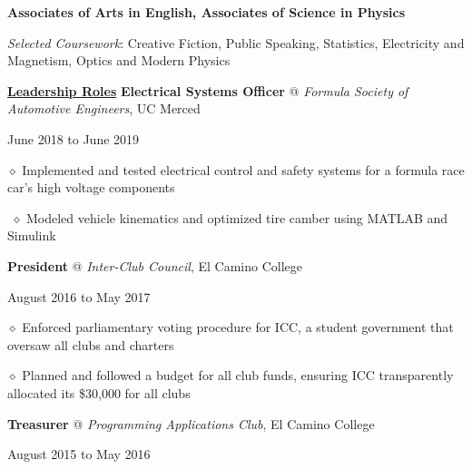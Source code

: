 \documentclass [11pt]{article}
\begin{document}
\begin{flushleft}
\textbf{Associates of Arts in English, Associates of Science in Physics}

\raggedright
\emph{Selected Coursework}: Creative Fiction, Public Speaking, Statistics, Electricity and Magnetism, Optics and Modern Physics
\normalsize

\linebreak
\raggedright

\vspace{7}
\underline{\textbf{Leadership Roles}}
\linebreak
\textbf{Electrical Systems Officer} @ \emph{Formula Society of Automotive Engineers}, UC Merced \begin{minipage}{0.300 \linewidth}\begin{flushright}June 2018 to June 2019\end{flushright}\end{minipage}

‭‭\quad\quad\quad$\diamond$ Implemented and tested electrical control and safety systems for a formula race car’s high voltage components

‭‭%
\quad\quad\quad$\diamond$ Modeled vehicle kinematics and optimized tire camber using MATLAB and Simulink

\linebreak
\textbf{President} @ \emph{Inter-Club Council}, El Camino College \begin{minipage}{0.565 \linewidth}\begin{flushright}August 2016 to May 2017\end{flushright}\end{minipage}

‭‭\quad\quad\quad$\diamond$ Enforced parliamentary voting procedure for ICC, a student government that oversaw all clubs and charters

‭‭\quad\quad\quad$\diamond$ Planned and followed a budget for all club funds, ensuring ICC transparently allocated its \$30,000 for all clubs

\linebreak
\textbf{Treasurer} @ \emph{Programming Applications Club}, El Camino College \begin{minipage}{0.450 \linewidth}\begin{flushright}August 2015 to May 2016\end{flushright}\end{minipage}


\end{flushleft}
\end{document}
